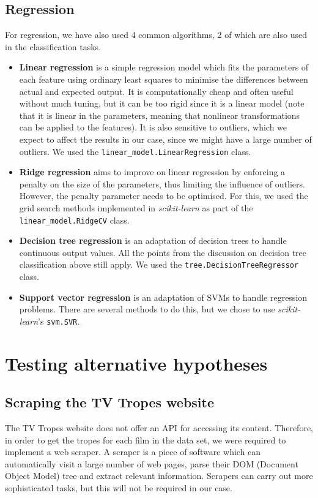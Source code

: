 \documentclass[bsc,frontabs,singlespacing,parskip, twoside]{infthesis}
\begin{document}
\subsection{Regression}
For regression, we have also used 4 common algorithms, 2 of which are also used in the classification tasks.
\begin{itemize}
	\item \textbf{Linear regression} is a simple regression model which fits the parameters of each feature using ordinary least squares to minimise the differences between actual and expected output. It is computationally cheap and often useful without much tuning, but it can be too rigid since it is a linear model (note that it is linear in the parameters, meaning that nonlinear transformations can be applied to the features). It is also sensitive to outliers, which we expect to affect the results in our case, since we might have a large number of outliers. We used the \texttt{linear\_model.LinearRegression} class.
	\item \textbf{Ridge regression} aims to improve on linear regression by enforcing a penalty on the size of the parameters, thus limiting the influence of outliers. However, the penalty parameter needs to be optimised. For this, we used the grid search methods implemented in \textit{scikit-learn} as part of the \texttt{linear\_model.RidgeCV} class.
	\item \textbf{Decision tree regression} \cite{breiman1984classification} is an adaptation of decision trees to handle continuous output values. All the points from the discussion on decision tree classification above still apply. We used the \texttt{tree.DecisionTreeRegressor} class.
	\item \textbf{Support vector regression} is an adaptation of SVMs to handle regression problems. There are several methods to do this, but we chose to use \textit{scikit-learn}'s \texttt{svm.SVR}.
\end{itemize}

\section{Testing alternative hypotheses}
\label{sec:alt_hyp_implementation}

\subsection{Scraping the TV Tropes website}
The TV Tropes website does not offer an API for accessing its content. Therefore, in order to get the tropes for each film in the data set, we were required to implement a web scraper. A scraper is a piece of software which can automatically visit a large number of web pages, parse their DOM (Document Object Model) tree and extract relevant information. Scrapers can carry out more sophisticated tasks, but this will not be required in our case.
\end{document}
